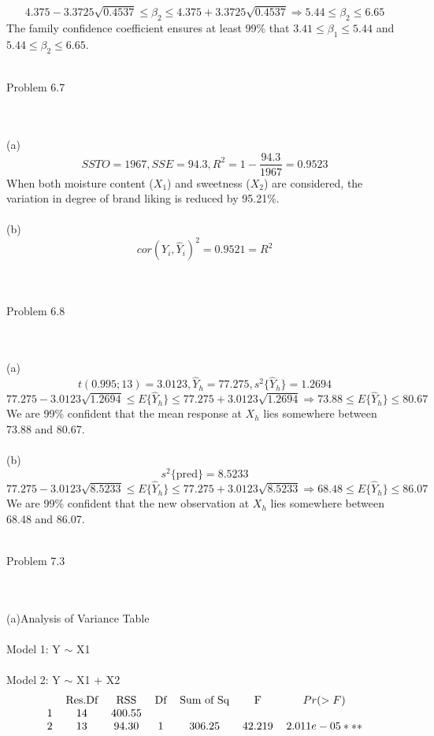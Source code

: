 \documentclass{article}
\begin{document}
    \[4.375-3.3725\sqrt{0.4537}\leq\beta_2\leq4.375+3.3725\sqrt{0.4537}\Rightarrow 5.44\leq\beta_2\leq6.65\]
    The family confidence coefficient ensures at least 99\% that $3.41\leq\beta_1\leq5.44$ and $5.44\leq\beta_2\leq6.65$.
    \\\\\begin{large}Problem 6.7\end{large}
\\\\(a)\[SSTO=1967,SSE=94.3,R^2=1-\frac{94.3}{1967}=0.9523\]
When both moisture content ($X_1$) and sweetness ($X_2$) are considered, the variation in degree of brand liking is reduced by 95.21\%.
\\\\(b)\[cor(Y_i,\hat Y_i)^2=0.9521=R^2\]
\\\\\begin{large}Problem 6.8\end{large}
\\\\(a)\[t(0.995;13)=3.0123,\hat Y_h=77.275,s^2\{\hat Y_h\}=1.2694\]
\[77.275-3.0123\sqrt{1.2694}\leq E\{\hat Y_h\}\leq77.275+3.0123\sqrt{1.2694}\Rightarrow 73.88\leq E\{\hat Y_h\}\leq80.67\]
We are 99\% confident that the mean response at $X_h$ lies somewhere between 73.88 and 80.67.
\\\\(b)\[s^2\{\text{pred}\}=8.5233\]
\[77.275-3.0123\sqrt{8.5233}\leq E\{\hat Y_h\}\leq77.275+3.0123\sqrt{8.5233}\Rightarrow 68.48\leq E\{\hat Y_h\}\leq86.07\]
We are 99\% confident that the new observation at $X_h$ lies somewhere between 68.48 and 86.07.
\\\\\begin{large}Problem 7.3\end{large}
\\\\(a)Analysis of Variance Table\\\\
Model 1: Y $\sim$ X1\\\\
Model 2: Y $\sim$ X1 + X2
\[
\begin{tabular}{ccccccc}  &Res.Df &   RSS& Df& Sum of Sq&      F&    $Pr(>F) $  \\
1 &    14& 400.55&&&&      \\                            
2 &    13  &94.30 & 1 &   306.25 &42.219 &$2.011e-05 ***$
\end{tabular}\]
\end{document}
